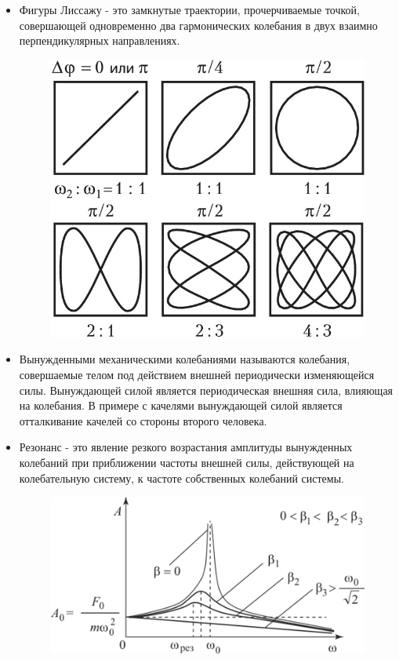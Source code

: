 \documentclass{article}
\begin{document}
\begin{flushleft}
\begin{itemize}
\begin{figure}[H]
        \end{figure}
        \item Фигуры Лиссажу - это замкнутые траектории, прочерчиваемые точкой, совершающей одновременно два гармонических колебания в двух взаимно перпендикулярных направлениях.
        \begin{figure}[H]
            \centering
            \includegraphics[width=0.3\linewidth]{images/FiguresLisaju.jpg}
            \label{fig:enter-label}
        \end{figure}
        \item Вынужденными механическими колебаниями называются колебания, совершаемые телом под действием внешней периодически изменяющейся силы. Вынуждающей силой является периодическая внешняя сила, влияющая на колебания. В примере с качелями вынуждающей силой является отталкивание качелей со стороны второго человека.
        \item Резонанс - это явление резкого возрастания амплитуды вынужденных колебаний при приближении частоты внешней силы, действующей на колебательную систему, к частоте собственных колебаний системы.
        \begin{figure}[H]
            \centering
            \includegraphics[width=0.4\linewidth]{images/Resonanse.png}
        \end{figure}
    \end{itemize}

\end{flushleft}
\end{document}
